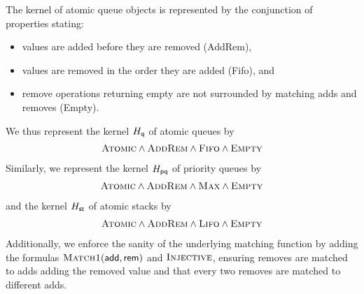 \begin{example}

  The kernel of atomic queue objects is represented by the conjunction of properties stating:
  \begin{itemize}


    \item values are added before they are removed ({\sc AddRem}),

    \item values are removed in the order they are added ({\sc Fifo}), and

    \item remove operations returning empty are not surrounded by matching adds
    and removes ({\sc Empty}).

  \end{itemize}
  We thus represent the kernel $H_{\sf q}$ of atomic queues by
  \begin{align*}
    \textsc{Atomic}  \land \textsc{AddRem}
      \land \textsc{Fifo} \land \textsc{Empty}
  \end{align*}
  Similarly, we represent the kernel $H_{\sf pq}$ of priority queues by
  \begin{align*}
    \textsc{Atomic} \land \textsc{AddRem}
      \land \textsc{Max} \land \textsc{Empty}
  \end{align*}
  and the kernel $H_{\sf st}$ of atomic stacks by
  \begin{align*}
    \textsc{Atomic} \land \textsc{AddRem}
      \land \textsc{Lifo} \land \textsc{Empty}
  \end{align*}
  Additionally, we enforce the sanity of the underlying matching function by
  adding the formulas $\textsc{Match1}({\sf add},{\sf
  rem})$ and $\textsc{Injective}$, ensuring removes are matched to adds adding 
  the removed value and that every two removes are matched to different adds.

\end{example}

